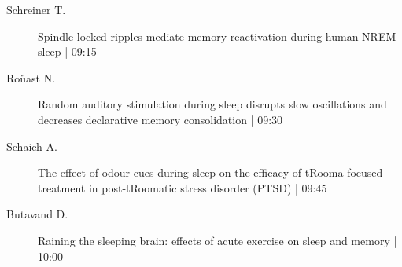\begin{symposium}
\begin{description}
                \item [ Schreiner T.] Spindle-locked ripples mediate memory reactivation during human NREM sleep \textcolor{mygray}{ | 09:15}    
                
                \item [ Roüast N.] Random auditory stimulation during sleep disrupts slow oscillations and decreases declarative memory consolidation \textcolor{mygray}{ | 09:30}    
                
                \item [ Schaich A.] The effect of odour cues during sleep on the efficacy of tRooma-focused treatment in post-tRoomatic stress disorder (PTSD) \textcolor{mygray}{ | 09:45}    
                
                \item [ Butavand D.] Raining the sleeping brain: effects of acute exercise on sleep and memory \textcolor{mygray}{ | 10:00}    
                
            \end{description} 
            \end{symposium}
            